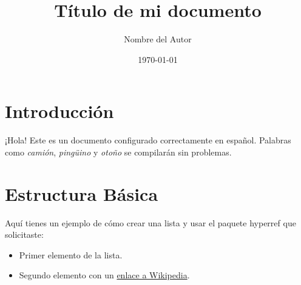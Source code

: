 \documentclass[11pt,a4paper]{article}
\title{Título de mi documento}
\author{Nombre del Autor}
\date{\today}
\begin{document}
\maketitle

\section{Introducción}
¡Hola! Este es un documento configurado correctamente en español. Palabras como \textit{camión}, \textit{pingüino} y \textit{otoño} se compilarán sin problemas.

\section{Estructura Básica}
Aquí tienes un ejemplo de cómo crear una lista y usar el paquete hyperref que solicitaste:

\begin{itemize}
    \item Primer elemento de la lista.
    \item Segundo elemento con un \href{https://es.wikipedia.org}{enlace a Wikipedia}.
\end{itemize}
\end{document}
